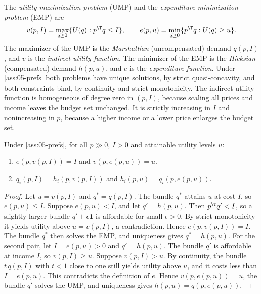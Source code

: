 The \emph{utility maximization problem} (UMP) and the \emph{expenditure minimization problem} (EMP) are
\begin{equation}\label{eq:05-ump-emp}
v(p, I) = \max_{q \geq 0}\{U(q) : p^\T q \leq I\}, \qquad
e(p, u) = \min_{q \geq 0}\{p^\T q : U(q) \geq u\}.
\end{equation}
The maximizer of the UMP is the \emph{Marshallian} (uncompensated) demand $q(p, I)$, and $v$ is the
\emph{indirect utility function}. The minimizer of the EMP is the \emph{Hicksian} (compensated) demand
$h(p, u)$, and $e$ is the \emph{expenditure function}. Under \cref{ass:05-prefs} both problems have unique
solutions, by strict quasi-concavity, and both constraints bind, by continuity and strict monotonicity. The
indirect utility function is homogeneous of degree zero in $(p, I)$, because scaling all prices and income
leaves the budget set unchanged. It is strictly increasing in $I$ and nonincreasing in $p$, because a higher
income or a lower price enlarges the budget set.

\begin{lemma}\label{lem:05-duality}
Under \cref{ass:05-prefs}, for all $p \gg 0$, $I > 0$ and attainable utility levels $u$:
\begin{enumerate}[label=(\roman*)]
\item $e(p, v(p, I)) = I$ and $v(p, e(p, u)) = u$.
\item $q_i(p, I) = h_i(p, v(p, I))$ and $h_i(p, u) = q_i(p, e(p, u))$.
\end{enumerate}
\end{lemma}

\begin{proof}
Let $u = v(p, I)$ and $q^* = q(p, I)$. The bundle $q^*$ attains $u$ at cost $I$, so $e(p, u) \leq I$.
Suppose $e(p, u) < I$, and let $q' = h(p, u)$. Then $p^\T q' < I$, so a slightly larger bundle
$q' + \epsilon\mathbf{1}$ is affordable for small $\epsilon > 0$. By strict monotonicity it yields utility
above $u = v(p, I)$, a contradiction. Hence $e(p, v(p,I)) = I$. The bundle $q^*$ then solves the EMP, and
uniqueness gives $q^* = h(p, u)$. For the second pair, let $I = e(p, u) > 0$ and $q' = h(p, u)$. The bundle
$q'$ is affordable at income $I$, so $v(p, I) \geq u$. Suppose $v(p, I) > u$. By continuity, the bundle
$t\,q(p, I)$ with $t < 1$ close to one still yields utility above $u$, and it costs less than $I = e(p, u)$.
This contradicts the definition of $e$. Hence $v(p, e(p,u)) = u$, the bundle $q'$ solves the UMP, and
uniqueness gives $h(p, u) = q(p, e(p, u))$.
\end{proof}

